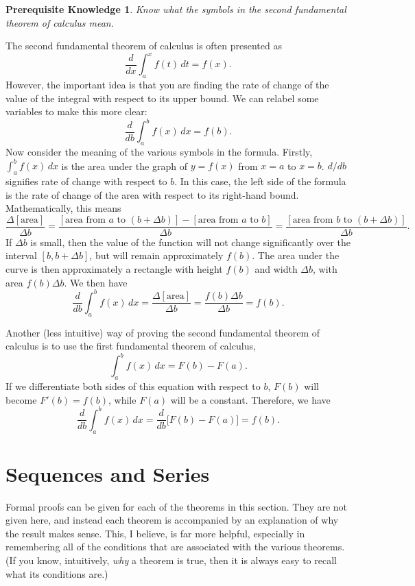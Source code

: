 \documentclass{myarticle}
\theoremstyle{nospace}
\newtheorem*{oldprereq}{Prerequisite Knowledge}
\newenvironment{prereq}
{\begin{mdframed}\begin{oldprereq}}
    {\end{oldprereq}\end{mdframed}}
\newtheorem{old series theorem}{Theorem}
\newenvironment{series theorem}
{\begin{mdframed}\begin{old series theorem}}
    {\end{old series theorem}\end{mdframed}}
\begin{document}
\begin{prereq}
  Know what the symbols in the second fundamental theorem of calculus
  mean.
\end{prereq}

The second fundamental theorem of calculus is often presented as
\[
  \frac{d}{dx} \int_a^x f(t) \,dt = f(x).
\]
However, the important idea is that you are finding the rate of change
of the value of the integral with respect to its upper bound. We can
relabel some variables to make this more clear:
\[
  \frac{d}{db} \int_a^b f(x) \, dx = f(b).
\]
Now consider the meaning of the various symbols in the formula.
Firstly, $\int_a^b f(x) \,dx$ is the area under the graph of
$y = f(x)$ from $x = a$ to $x = b$. $d/db$ signifies rate of change
with respect to $b$. In this case, the left side of the formula is the
rate of change of the area with respect to its right-hand bound.
Mathematically, this means
\[
  \frac{\Delta[\text{area}]}{\Delta b}
  = \frac{
    [\text{area from $a$ to $(b + \Delta b)$}]
    - [\text{area from $a$ to $b$}]}
  {\Delta b}
  = \frac{[\text{area from $b$ to $(b + \Delta b)$}]}{\Delta b}.
\]
If $\Delta b$ is small, then the value of the function will not change
significantly over the interval $[b, b + \Delta b]$, but will remain
approximately $f(b)$. The area under the curve is then approximately a
rectangle with height $f(b)$ and width $\Delta b$, with area
$f(b) \Delta b$. We then have
\[
  \frac{d}{db}\int_a^b f(x)\,dx
  = \frac{\Delta[\text{area}]}{\Delta b}
  = \frac{f(b)\Delta b}{\Delta b}
  = f(b).
\]

Another (less intuitive) way of proving the second fundamental theorem
of calculus is to use the first fundamental theorem of calculus,
\[
  \int_a^b f(x) \,dx = F(b) - F(a).
\]
If we differentiate both sides of this equation with respect to $b$,
$F(b)$ will become $F'(b) = f(b)$, while $F(a)$ will be a constant.
Therefore, we have
\[
  \frac{d}{db} \int_a^b f(x) \,dx
  = \frac{d}{db}\bigg[F(b) - F(a)\bigg]
  = f(b).
\]

\section{Sequences and Series}
\label{sec:sequences and series}

Formal proofs can be given for each of the theorems in this section.
They are not given here, and instead each theorem is accompanied by an
explanation of why the result makes sense. This, I believe, is far
more helpful, especially in remembering all of the conditions that are
associated with the various theorems. (If you know, intuitively,
\emph{why} a theorem is true, then it is always easy to recall what
its conditions are.)
\end{document}
